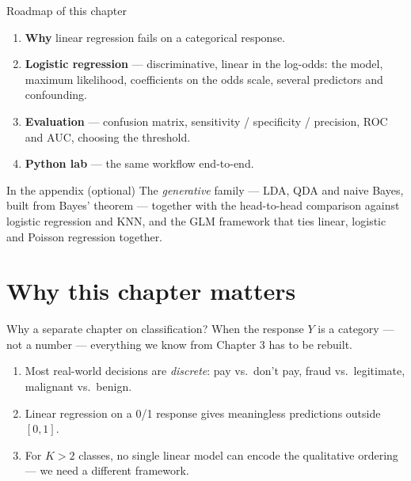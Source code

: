 \documentclass[aspectratio=169,11pt]{beamer}
\begin{document}
\begin{frame}{Roadmap of this chapter}
  \begin{takeaway}
    \begin{enumerate}
      \item \textbf{Why} linear regression fails on a categorical response.
      \item \textbf{Logistic regression} --- discriminative, linear in the
            log-odds: the model, maximum likelihood, coefficients on the odds
            scale, several predictors and confounding.
      \item \textbf{Evaluation} --- confusion matrix, sensitivity /
            specificity / precision, ROC and AUC, choosing the threshold.
      \item \textbf{Python lab} --- the same workflow end-to-end.
    \end{enumerate}
  \end{takeaway}
  \begin{block}{In the appendix (optional)}
    \footnotesize
    The \emph{generative} family --- LDA, QDA and naive Bayes, built from
    Bayes' theorem --- together with the head-to-head comparison against
    logistic regression and KNN, and the GLM framework that ties linear,
    logistic and Poisson regression together.
  \end{block}
\end{frame}

\section{Why this chapter matters}

\begin{frame}{Why a separate chapter on classification?}
  When the response $Y$ is a category --- not a number --- everything we
  know from Chapter 3 has to be rebuilt.
  \begin{takeaway}
    \begin{enumerate}
      \item Most real-world decisions are \emph{discrete}: pay vs.\
            don't pay, fraud vs.\ legitimate, malignant vs.\ benign.
      \item Linear regression on a 0/1 response gives meaningless
            predictions outside $[0,1]$.
      \item For $K > 2$ classes, no single linear model can encode the
            qualitative ordering --- we need a different framework.
    \end{enumerate}
  \end{takeaway}
\end{frame}
\end{document}
